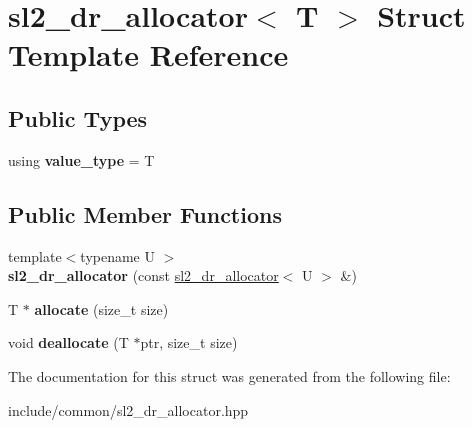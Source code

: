 \hypertarget{structsl2__dr__allocator}{}\section{sl2\+\_\+dr\+\_\+allocator$<$ T $>$ Struct Template Reference}
\label{structsl2__dr__allocator}
\subsection*{Public Types}
\begin{DoxyCompactItemize}
\item 
\mbox{\label{structsl2__dr__allocator_a0d009d7e858234352cd3d1ccaea9a80d}} 
using {\bfseries value\+\_\+type} = T
\end{DoxyCompactItemize}
\subsection*{Public Member Functions}
\begin{DoxyCompactItemize}
\item 
\mbox{\label{structsl2__dr__allocator_a10a5c8f4b5d0906b5edbbbca8ea3188c}} 
{\footnotesize template$<$typename U $>$ }\\{\bfseries sl2\+\_\+dr\+\_\+allocator} (const \mbox{\hyperlink{structsl2__dr__allocator}{sl2\+\_\+dr\+\_\+allocator}}$<$ U $>$ \&)
\item 
\mbox{\label{structsl2__dr__allocator_a70d9f900352eb7bace905b8cc7b0990a}} 
T $\ast$ {\bfseries allocate} (size\+\_\+t size)
\item 
\mbox{\label{structsl2__dr__allocator_a0427afdc478190015ffeaedf58f61c00}} 
void {\bfseries deallocate} (T $\ast$ptr, size\+\_\+t size)
\end{DoxyCompactItemize}


The documentation for this struct was generated from the following file\+:\begin{DoxyCompactItemize}
\item 
include/common/sl2\+\_\+dr\+\_\+allocator.\+hpp\end{DoxyCompactItemize}
